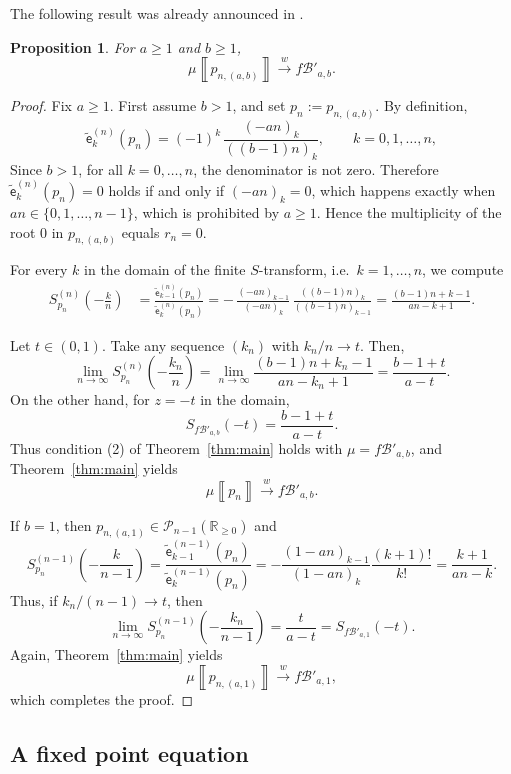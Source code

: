 \documentclass[a4paper,11pt]{amsart}
\numberwithin{equation}{section}
\newtheorem{proposition}[theorem]{Proposition}
\newcommand{\weak}{\xrightarrow{w}}
\newcommand{\R}{\mathbb{R}}
\newcommand{\pols}{\mathcal P}
\newcommand{\falling}[2]{\left(#1\right)_{#2}}
\newcommand{\meas}[1]{\mu\! \left\llbracket #1 \right\rrbracket}
\newcommand{\coef}[2]{\widetilde{\mathsf{e}}_{#1}^{(#2)}} %
\newcommand{\strans}[2]{S_{#1}^{(#2)}}   %
\begin{document}
The following result was already announced in \cite[Section 5.3]{MMP23}. 
 \begin{proposition}\label{pro:conv_pn}
For $a\geq 1$ and $b\geq 1$, 
\[
\meas{p_{n, (a, b)}} \weak f\mathcal{B}'_{a,b}.
\]
 \end{proposition}
\begin{proof}
Fix $a\geq 1$. First assume $b>1$, and set $p_n:=p_{n,(a,b)}$.
By definition,
\[
\coef{k}{n}(p_n)=(-1)^k\,\frac{(-an)_k}{((b-1)n)_k},
\qquad k=0,1,\dots,n,
\]
Since $b>1$, for all $k=0,\ldots,n$, the denominator is not zero.
Therefore $\coef{k}{n}(p_n)=0$ holds if and only if $\falling{-an}{k}=0$, which happens exactly when
$an\in\{0,1,\dots,n-1\}$, which is prohibited by $a\geq 1$. Hence the multiplicity of the root $0$ in $p_{n,(a,b)}$ equals $r_n=0$.

For every $k$ in the domain of the finite $S$-transform, i.e.\ $k=1,\dots,n$, we compute
\begin{align*}
\strans{p_n}{n}\!\left(-\frac{k}{n}\right)
&=\frac{\coef{k-1}{n}(p_n)}{\coef{k}{n}(p_n)}
= -\,\frac{\falling{-an}{k-1}}{\falling{-an}{k}}\,
   \frac{\falling{(b-1)n}{k}}{\falling{(b-1)n}{k-1}} 
= \frac{(b-1)n+k-1}{an-k+1}.
\end{align*}

Let $t\in(0,1)$.
Take any sequence $(k_n)$ with $k_n/n\to t$. Then,
\[
\lim_{n\to\infty}\strans{p_n}{n}\!\left(-\frac{k_n}{n}\right)
=\lim_{n\to\infty}\frac{(b-1)n+k_n-1}{an-k_n+1}
=\frac{b-1+t}{a-t}.
\]
On the other hand, for $z=-t$ in the domain,
\[
S_{f\mathcal{B}'_{a,b}}(-t)=\frac{b-1+t}{a-t}.
\]
Thus condition (2) of Theorem~\ref{thm:main} holds with $\mu=f\mathcal{B}'_{a,b}$, and
Theorem~\ref{thm:main} yields 
\[
\meas{p_n}\weak f\mathcal{B}'_{a,b}.
\]

If $b=1$, then $p_{n,(a,1)}\in\pols_{n-1}(\R_{\geq 0})$ and 
\[
\strans{p_n}{n-1}\!\left(-\frac{k}{n-1}\right)
=\frac{\coef{k-1}{n-1}(p_n)}{\coef{k}{n-1}(p_n)} = -\frac{(1-an)_{k-1}}{(1-an)_k}\frac{(k+1)!}{k!} = \frac{k+1}{a n-k}.
\]
Thus, if $k_n/(n-1)\to t$, then 
\[
\lim_{n\to\infty} \strans{p_n}{n-1}\!\left(-\frac{k_n}{n-1}\right)= \frac{t}{a-t} = S_{f\mathcal{B}'_{a,1}}(-t).
\]
Again, Theorem~\ref{thm:main} yields
\[
\meas{p_{n,(a,1)}}\weak f\mathcal B'_{a,1},
\]
which completes the proof. 
\end{proof}


\subsection{A fixed point equation}
\end{document}
